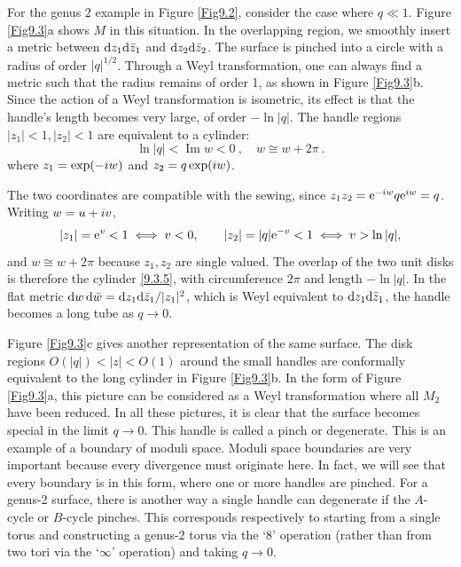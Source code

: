 For the genus 2 example in Figure \ref{Fig9.2}, consider the case where $q \ll 1$.
Figure \ref{Fig9.3}a shows $M$ in this situation. 
In the overlapping region, we smoothly insert a metric between $\mathrm{d} z_{1} \mathrm{d} \bar{z}_{1}$ and $\mathrm{d} z_{2} \mathrm{d} \bar{z}_{2}$. 
The surface is pinched into a circle with a radius of order $|q|^{1/2} $. Through a Weyl transformation, one can always find a metric such that the radius remains of order 1, as shown in Figure \ref{Fig9.3}b.
Since the action of a Weyl transformation is isometric, its effect is that the handle's length becomes very large, of order $-\ln |q|$. The handle regions $|z_{1}|<1, |z_{2}|<1$ are equivalent to a cylinder:
\begin{equation}
	\ln |q|<\operatorname{Im} w<0 \:, \quad w \cong w+2 \pi \:.
	\label{9.3.5}
\end{equation}
where $z_{1}=\exp (-i w)$ and $z_{2}=q \exp (i w) $.
\begin{tcolorbox}[breakable]
	\begin{remark}
		The two coordinates are compatible with the sewing, since $z_1z_2=\mathrm{e}^{-i w}q\mathrm{e}^{i w}=q$. Writing $w=u+i v$,
		\begin{equation*}
			|z_1|=\mathrm{e}^{v}<1\iff v<0,\qquad |z_2|=|q|\mathrm{e}^{-v}<1\iff v>\ln|q| ,
		\end{equation*}
		and $w\cong w+2\pi$ because $z_1,z_2$ are single valued. The overlap of the two unit disks is therefore the cylinder \eqref{9.3.5}, with circumference $2\pi$ and length $-\ln|q|$. In the flat metric $\mathrm{d} w\,\mathrm{d}\bar w=\mathrm{d} z_1\mathrm{d}\bar z_1/|z_1|^2$, which is Weyl equivalent to $\mathrm{d} z_1\mathrm{d}\bar z_1$, the handle becomes a long tube as $q\to0$.
	\end{remark}
\end{tcolorbox}
\noindent Figure \ref{Fig9.3}c gives another representation of the same surface.
The disk regions $O(|q|)<|z|<O(1)$ around the small handles are conformally equivalent to the long cylinder in Figure \ref{Fig9.3}b. 
In the form of Figure \ref{Fig9.3}a, this picture can be considered as a Weyl transformation where all $M_{2}$ have been reduced.
In all these pictures, it is clear that the surface becomes special in the limit $q \rightarrow 0$. This handle is called a pinch or degenerate. This is an example of a boundary of moduli space. 
Moduli space boundaries are very important because every divergence must originate here. In fact, we will see that every boundary is in this form, where one or more handles are pinched. 
For a genus-2 surface, there is another way a single handle can degenerate if the $A$-cycle or $B$-cycle pinches.
This corresponds respectively to starting from a single torus and constructing a genus-2 torus via the `8' operation (rather than from two tori via the `$\infty$' operation) and taking $q \rightarrow 0$.

